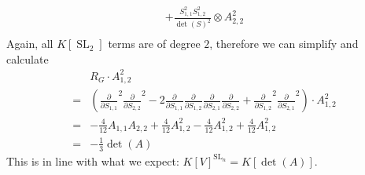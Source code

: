 \begin{example}
\begin{equation}
\begin{aligned}
      + \frac{S_{1,1}^2S_{1,2}^2}{\operatorname{det}(S)^2} \otimes A_{2,2}^2\\      
    \end{aligned}
  \end{equation}
  Again, all $K[\operatorname{SL}_2]$ terms are of degree $2$, therefore we can simplify and calculate
  \begin{equation}
    \begin{aligned}
      &R_G \cdot A_{1,2}^2\\
      =& \left( \frac{\partial}{\partial S_{1,1}}^2 \frac{\partial}{\partial S_{2,2}}^2 - 2 \frac{\partial}{\partial S_{1,1}} \frac{\partial}{\partial S_{1,2}} \frac{\partial}{\partial S_{2,1}} \frac{\partial}{\partial S_{2,2}} + \frac{\partial}{\partial S_{1,2}}^2\frac{\partial}{\partial S_{2,1}}^2 \right) \cdot A_{1,2}^2 \\
      =& - \frac{4}{12} A_{1,1}A_{2,2} + \frac{4}{12} A_{1,2}^2 - \frac{4}{12} A_{1,2}^2 + \frac{4}{12} A_{1,2}^2 \\
      =& -\frac{1}{3}\operatorname{det}(A)
    \end{aligned}
  \end{equation}
  This is in line with what we expect: $K[V]^{\operatorname{SL}_n} = K[\operatorname{det}(A)]$.
\end{example}


